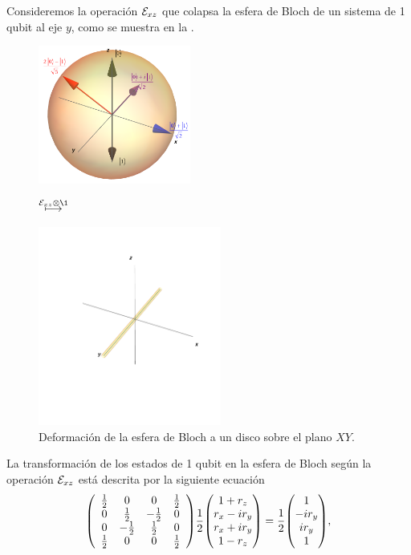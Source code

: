 Consideremos la operación $\mathcal{E}_{xz}$ que colapsa la esfera de Bloch de 
un sistema de 1 qubit al eje $y$, como se muestra en la .
\begin{figure}[H]
    \centering
    \begin{minipage}{.4\textwidth}
        \centering
        \includegraphics[width=5cm]
        {img-congreso/bloch.png}
    \end{minipage}
    $\stackrel{\E_{xz}\otimes\1 \vspace{1cm}}{\longmapsto}$
    \begin{minipage}{0.4\textwidth}
        \centering
        \includegraphics[width=6cm]
        {img-congreso/lineY}
    \end{minipage}
    \caption{Deformación de la esfera de Bloch a un disco sobre el plano $XY$.}
    \label{fig:QC-ex2}
\end{figure}
La transformación de los estados de 1 qubit en la esfera de Bloch 
según la operación $\mathcal{E}_{xz}$ está descrita por la siguiente ecuación
\begin{align}
\mqty(
\begin{array}{cccc}
\frac{1}{2} & 0 & 0 & \frac{1}{2} \\
0 & \frac{1}{2} & -\frac{1}{2} & 0 \\
0 & -\frac{1}{2} & \frac{1}{2} & 0 \\
\frac{1}{2} & 0 & 0 & \frac{1}{2} \\
\end{array}
)
\frac{1}{2}
\mqty(
1+r_z\\r_x-ir_y\\r_x+ir_y\\1-r_z
)
=
\frac{1}{2}
\mqty(
1\\-ir_y\\ir_y\\1
),
\label{eq:QC-ex2-SR}
\end{align}
